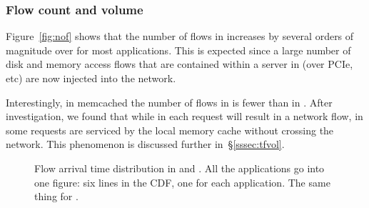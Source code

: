 \subsubsection{Flow count and volume}
\label{sssec:fctv}
Figure~\ref{fig:nof} shows that the number of flows in \dis increases by several orders of magnitude over \pdis for most applications. This is expected since a large number of disk and memory access flows that are contained within a server in \pdis (over PCIe, etc) are now injected into the network.

Interestingly, in memcached the number of flows in \dis is fewer than in \pdis. After investigation, we found that while in \pdis each request will result in a network flow, in \dis some requests are serviced by the local memory cache without crossing the network. This phenomenon is discussed further in~\S\ref{sssec:tfvol}.
%
%
\begin{figure}
  \centering
  \caption{\small{Flow arrival time distribution in \dis and \pdis. All the applications go into one figure: six lines in the CDF, one for each application. The same thing for \pdis.}}
  \label{fig:fat}
\end{figure}
%
